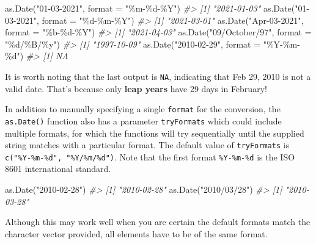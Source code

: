 \documentclass[
]{book}
\newenvironment{Shaded}{\begin{snugshade}}{\end{snugshade}}
\newcommand{\AttributeTok}[1]{\textcolor[rgb]{0.77,0.63,0.00}{#1}}
\newcommand{\CommentTok}[1]{\textcolor[rgb]{0.56,0.35,0.01}{\textit{#1}}}
\newcommand{\FunctionTok}[1]{\textcolor[rgb]{0.00,0.00,0.00}{#1}}
\newcommand{\NormalTok}[1]{#1}
\newcommand{\StringTok}[1]{\textcolor[rgb]{0.31,0.60,0.02}{#1}}
\begin{document}
\begin{Shaded}
\begin{Highlighting}[]
\FunctionTok{as.Date}\NormalTok{(}\StringTok{"01{-}03{-}2021"}\NormalTok{, }\AttributeTok{format =} \StringTok{"\%m{-}\%d{-}\%Y"}\NormalTok{)}
\CommentTok{\#\textgreater{} [1] "2021{-}01{-}03"}
\FunctionTok{as.Date}\NormalTok{(}\StringTok{"01{-}03{-}2021"}\NormalTok{, }\AttributeTok{format =} \StringTok{"\%d{-}\%m{-}\%Y"}\NormalTok{)}
\CommentTok{\#\textgreater{} [1] "2021{-}03{-}01"}
\FunctionTok{as.Date}\NormalTok{(}\StringTok{"Apr{-}03{-}2021"}\NormalTok{, }\AttributeTok{format =} \StringTok{"\%b{-}\%d{-}\%Y"}\NormalTok{)}
\CommentTok{\#\textgreater{} [1] "2021{-}04{-}03"}
\FunctionTok{as.Date}\NormalTok{(}\StringTok{"09/October/97"}\NormalTok{, }\AttributeTok{format =} \StringTok{"\%d/\%B/\%y"}\NormalTok{)}
\CommentTok{\#\textgreater{} [1] "1997{-}10{-}09"}
\FunctionTok{as.Date}\NormalTok{(}\StringTok{"2010{-}02{-}29"}\NormalTok{, }\AttributeTok{format =} \StringTok{"\%Y{-}\%m{-}\%d"}\NormalTok{)}
\CommentTok{\#\textgreater{} [1] NA}
\end{Highlighting}
\end{Shaded}

It is worth noting that the last output is \texttt{NA}, indicating that Feb 29, 2010 is not a valid date. That's because only \textbf{leap years} have 29 days in February!

In addition to manually specifying a single \texttt{format} for the conversion, the \texttt{as.Date()} function also has a parameter \texttt{tryFormats} which could include multiple formats, for which the functions will try sequentially until the supplied string matches with a particular format. The default value of \texttt{tryFormats} is \texttt{c("\%Y-\%m-\%d",\ "\%Y/\%m/\%d")}. Note that the first format \texttt{\%Y-\%m-\%d} is the ISO 8601 international standard.

\begin{Shaded}
\begin{Highlighting}[]
\FunctionTok{as.Date}\NormalTok{(}\StringTok{"2010{-}02{-}28"}\NormalTok{)}
\CommentTok{\#\textgreater{} [1] "2010{-}02{-}28"}
\FunctionTok{as.Date}\NormalTok{(}\StringTok{"2010/03/28"}\NormalTok{)}
\CommentTok{\#\textgreater{} [1] "2010{-}03{-}28"}
\end{Highlighting}
\end{Shaded}

Although this may work well when you are certain the default formats match the character vector provided, all elements have to be of the same format.
\end{document}
